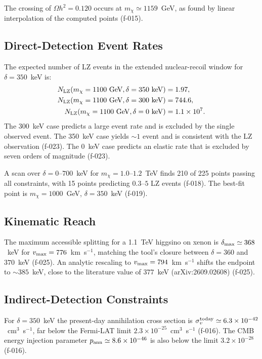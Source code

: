\documentclass[11pt,a4paper]{article}
\begin{document}
The crossing of $\Omega h^2=0.120$ occurs at $m_\chi\simeq1159$~GeV, as found by linear interpolation of the computed points (f-015).

\subsection{Direct-Detection Event Rates}
The expected number of LZ events in the extended nuclear-recoil window for $\delta=350$~keV is:
\begin{align}
N_{\rm LZ}(m_\chi=1100~{\rm GeV},\delta=350~{\rm keV}) &= 1.97,\\
N_{\rm LZ}(m_\chi=1100~{\rm GeV},\delta=300~{\rm keV}) &= 744.6,\\
N_{\rm LZ}(m_\chi=1100~{\rm GeV},\delta=0~{\rm keV}) &= 1.1\times10^7.
\end{align}
The 300~keV case predicts a large event rate and is excluded by the single observed event.  The 350~keV case yields $\sim1$ event and is consistent with the LZ observation (f-023).  The 0~keV case predicts an elastic rate that is excluded by seven orders of magnitude (f-023).

A scan over $\delta=0$--$700$~keV for $m_\chi=1.0$--$1.2$~TeV finds 210 of 225 points passing all constraints, with 15 points predicting $0.3$--$5$ LZ events (f-018).  The best-fit point is $m_\chi=1000$~GeV, $\delta=350$~keV (f-019).

\subsection{Kinematic Reach}
The maximum accessible splitting for a 1.1~TeV higgsino on xenon is $\delta_{\rm max}\simeq368$~keV for $v_{\rm max}=776$~km~s$^{-1}$, matching the tool's closure between $\delta=360$ and $370$~keV (f-025).  An analytic rescaling to $v_{\rm max}=794$~km~s$^{-1}$ shifts the endpoint to $\sim385$~keV, close to the literature value of $377$~keV (arXiv:2609.02608) (f-025).

\subsection{Indirect-Detection Constraints}
For $\delta=350$~keV the present-day annihilation cross section is $\sigma_v^{\rm today}\simeq6.3\times10^{-42}$~cm$^3$~s$^{-1}$, far below the Fermi-LAT limit $2.3\times10^{-25}$~cm$^3$~s$^{-1}$ (f-016).  The CMB energy injection parameter $p_{\rm ann}\simeq8.6\times10^{-46}$ is also below the limit $3.2\times10^{-28}$ (f-016).
\end{document}
